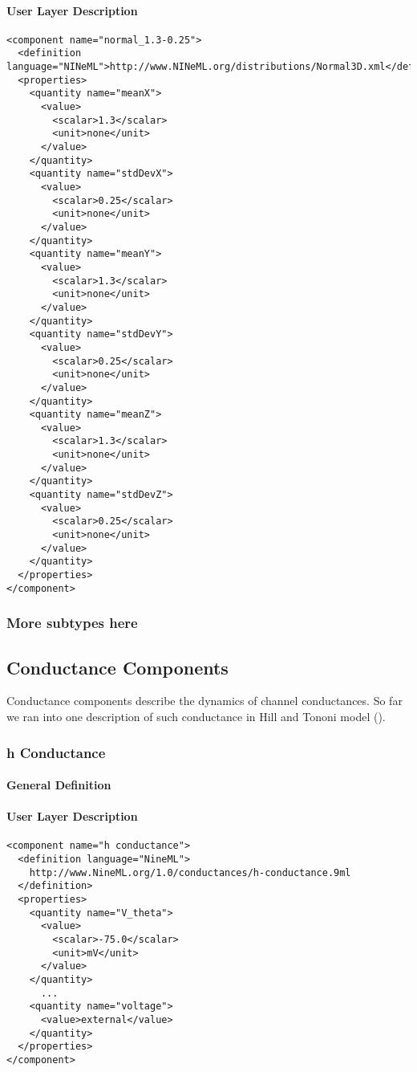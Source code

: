 \documentclass{article}
\begin{document}
\paragraph{User Layer Description}
\begin{verbatim}
<component name="normal_1.3-0.25">
  <definition language="NINeML">http://www.NINeML.org/distributions/Normal3D.xml</definition>
  <properties>
    <quantity name="meanX">
      <value>
        <scalar>1.3</scalar>
        <unit>none</unit>
      </value>
    </quantity>
    <quantity name="stdDevX">
      <value>
        <scalar>0.25</scalar>
        <unit>none</unit>
      </value>
    </quantity>
    <quantity name="meanY">
      <value>
        <scalar>1.3</scalar>
        <unit>none</unit>
      </value>
    </quantity>
    <quantity name="stdDevY">
      <value>
        <scalar>0.25</scalar>
        <unit>none</unit>
      </value>
    </quantity>
    <quantity name="meanZ">
      <value>
        <scalar>1.3</scalar>
        <unit>none</unit>
      </value>
    </quantity>
    <quantity name="stdDevZ">
      <value>
        <scalar>0.25</scalar>
        <unit>none</unit>
      </value>
    </quantity>
  </properties>
</component>
\end{verbatim}

\subsubsection{More subtypes here}

\subsection{Conductance Components}
\label{cond}

Conductance components describe the dynamics of channel conductances. So far we ran
into one description of such conductance in Hill and Tononi model (\cite{hill-tononi-05}).

\subsubsection{h Conductance}
\label{h-cond}

\paragraph{General Definition}

\paragraph{User Layer Description}
\begin{verbatim}
<component name="h conductance">
  <definition language="NineML">
    http://www.NineML.org/1.0/conductances/h-conductance.9ml
  </definition>
  <properties>
    <quantity name="V_theta">
      <value>
        <scalar>-75.0</scalar>
        <unit>mV</unit>
      </value>
    </quantity>
      ...
    <quantity name="voltage">
      <value>external</value>
    </quantity>
  </properties>
</component>
\end{verbatim}
\end{document}
